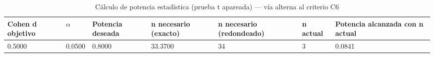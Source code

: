 \begin{table}[htbp]
\centering
\caption{Cálculo de potencia estadística (prueba t apareada) — vía alterna al criterio C6}
\label{tab:power_calculation}
\begin{tabular}{lllllll}
\toprule
Cohen d objetivo & $\alpha$ & Potencia deseada & n necesario (exacto) & n necesario (redondeado) & n actual & Potencia alcanzada con n actual \\
\midrule
0.5000 & 0.0500 & 0.8000 & 33.3700 & 34 & 3 & 0.0841 \\
\bottomrule
\end{tabular}
\end{table}
